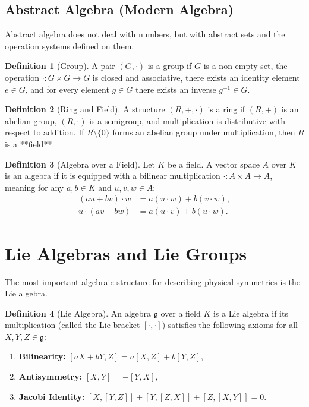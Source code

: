 \documentclass[11pt,a4paper,oneside]{book}
\theoremstyle{definition}
\newtheorem{definition}{Definition}[chapter]
\theoremstyle{plain}
\newcommand{\Lie}{\mathfrak{g}}
\begin{document}
\subsection{Abstract Algebra (Modern Algebra)}
Abstract algebra does not deal with numbers, but with abstract sets and the operation systems defined on them.

\begin{definition}[Group]
A pair $(G, \cdot)$ is a group if $G$ is a non-empty set, the operation $\cdot: G \times G \to G$ is closed and associative, there exists an identity element $e \in G$, and for every element $g \in G$ there exists an inverse $g^{-1} \in G$.
\end{definition}

\begin{definition}[Ring and Field]
A structure $(R, +, \cdot)$ is a ring if $(R, +)$ is an abelian group, $(R, \cdot)$ is a semigroup, and multiplication is distributive with respect to addition. If $R \setminus \{0\}$ forms an abelian group under multiplication, then $R$ is a **field**.
\end{definition}

\begin{definition}[Algebra over a Field]
Let $K$ be a field. A vector space $A$ over $K$ is an algebra if it is equipped with a bilinear multiplication $\cdot: A \times A \to A$, meaning for any $a, b \in K$ and $u, v, w \in A$:
\begin{align}
(a u + b v) \cdot w &= a (u \cdot w) + b (v \cdot w), \\
u \cdot (a v + b w) &= a (u \cdot v) + b (u \cdot w).
\end{align}
\end{definition}

\section{Lie Algebras and Lie Groups}
The most important algebraic structure for describing physical symmetries is the Lie algebra.

\begin{definition}[Lie Algebra]
An algebra $\Lie$ over a field $K$ is a Lie algebra if its multiplication (called the Lie bracket $[\cdot, \cdot]$) satisfies the following axioms for all $X, Y, Z \in \Lie$:
\begin{enumerate}[label=\roman*)]
    \item \textbf{Bilinearity:} $[aX + bY, Z] = a[X, Z] + b[Y, Z]$,
    \item \textbf{Antisymmetry:} $[X, Y] = -[Y, X]$,
    \item \textbf{Jacobi Identity:} $[X, [Y, Z]] + [Y, [Z, X]] + [Z, [X, Y]] = 0$.
\end{enumerate}
\end{definition}
\end{document}
